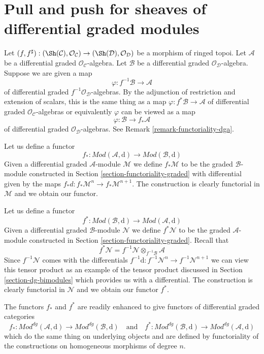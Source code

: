 \section{Pull and push for sheaves of differential graded modules}
\label{section-functoriality-dg}

\noindent
Let $(f, f^\sharp) : (\Sh(\mathcal{C}), \mathcal{O}_\mathcal{C})
\to (\Sh(\mathcal{D}), \mathcal{O}_\mathcal{D})$
be a morphism of ringed topoi. Let $\mathcal{A}$ be a differential
graded $\mathcal{O}_\mathcal{C}$-algebra. Let $\mathcal{B}$ be a
differential graded $\mathcal{O}_\mathcal{D}$-algebra.
Suppose we are given a map
$$
\varphi : f^{-1}\mathcal{B} \to \mathcal{A}
$$
of differential graded $f^{-1}\mathcal{O}_\mathcal{D}$-algebras.
By the adjunction of restriction and extension of scalars, this
is the same thing as a map $\varphi : f^*\mathcal{B} \to \mathcal{A}$
of differential graded $\mathcal{O}_\mathcal{C}$-algebras or equivalently
$\varphi$ can be viewed as a map
$$
\varphi : \mathcal{B} \to f_*\mathcal{A}
$$
of differential graded $\mathcal{O}_\mathcal{D}$-algebras.
See Remark \ref{remark-functoriality-dga}.

\medskip\noindent
Let us define a functor
$$
f_* :
\textit{Mod}(\mathcal{A}, \text{d})
\longrightarrow
\textit{Mod}(\mathcal{B}, \text{d})
$$
Given a differential graded $\mathcal{A}$-module $\mathcal{M}$ we define
$f_*\mathcal{M}$ to be the graded $\mathcal{B}$-module constructed
in Section \ref{section-functoriality-graded} with differential
given by the maps $f_*d : f_*\mathcal{M}^n \to f_*\mathcal{M}^{n + 1}$.
The construction is clearly functorial in
$\mathcal{M}$ and we obtain our functor.

\medskip\noindent
Let us define a functor
$$
f^* :
\textit{Mod}(\mathcal{B}, \text{d})
\longrightarrow
\textit{Mod}(\mathcal{A}, \text{d})
$$
Given a differential graded $\mathcal{B}$-module $\mathcal{N}$
we define $f^*\mathcal{N}$ to be the graded $\mathcal{A}$-module
constructed in Section \ref{section-functoriality-graded}. Recall
that
$$
f^*\mathcal{N} = f^{-1}\mathcal{N} \otimes_{f^{-1}\mathcal{B}} \mathcal{A}
$$
Since $f^{-1}\mathcal{N}$ comes with the differentials
$f^{-1}\text{d} : f^{-1}\mathcal{N}^n \to f^{-1}\mathcal{N}^{n + 1}$
we can view this tensor product as an example of the
tensor product discussed in Section \ref{section-dg-bimodules}
which provides us with a differential.
The construction is clearly functorial in
$\mathcal{N}$ and we obtain our functor $f^*$.

\medskip\noindent
The functors $f_*$ and $f^*$ are readily enhanced to give
functors of differential graded categories
$$
f_* :
\textit{Mod}^{dg}(\mathcal{A}, \text{d})
\longrightarrow
\textit{Mod}^{dg}(\mathcal{B}, \text{d})
\quad\text{and}\quad
f^* :
\textit{Mod}^{dg}(\mathcal{B}, \text{d})
\longrightarrow
\textit{Mod}^{dg}(\mathcal{A}, \text{d})
$$
which do the same thing on underlying objects and are defined
by functoriality of the constructions on homogeneous morphisms
of degree $n$.

